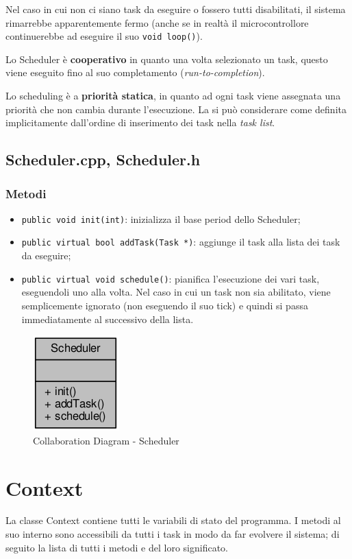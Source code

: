 Nel caso in cui non ci siano task da eseguire o fossero tutti disabilitati, il sistema rimarrebbe apparentemente fermo (anche se in realtà il microcontrollore continuerebbe ad eseguire il suo \texttt{void loop()}).

Lo Scheduler è \textbf{cooperativo} in quanto una volta selezionato un task, questo viene eseguito fino al suo completamento (\textit{run-to-completion}).

Lo scheduling è a \textbf{priorità statica}, in quanto ad ogni task viene assegnata una priorità che non cambia durante l'esecuzione. La si può considerare come definita implicitamente dall'ordine di inserimento dei task nella \textit{task list}.

\subsection{Scheduler.cpp, Scheduler.h}
\subsubsection{Metodi}
\begin{itemize}
	\item \texttt{public void init(int)}: inizializza il base period dello Scheduler;
	\item \texttt{public virtual bool addTask(Task *)}: aggiunge il task alla lista dei task da eseguire;
	\item \texttt{public virtual void schedule()}: pianifica l'esecuzione dei vari task, eseguendoli uno alla volta. Nel caso in cui un task non sia abilitato, viene semplicemente ignorato (non eseguendo il suo tick) e quindi si passa immediatamente al successivo della lista.
\end{itemize}
\begin{figure}[!ht]
	\centering
	\includegraphics[scale=.5]{img/UML/CollaborationDiagram/Scheduler.png}
	\caption{Collaboration Diagram - Scheduler}
\end{figure}

\section{Context}\label{sec:contextimpl}
La classe Context contiene tutti le variabili di stato del programma. I metodi al suo interno sono accessibili da tutti i task in modo da far evolvere il sistema; di seguito la lista di tutti i metodi e del loro significato.
